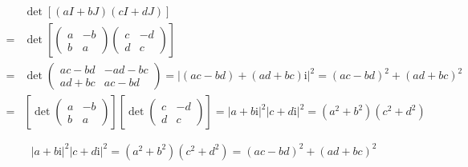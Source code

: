 \documentclass[
]{book}
\theoremstyle{definition}
\theoremstyle{definition}
\theoremstyle{definition}
\theoremstyle{definition}
\theoremstyle{remark}
\begin{document}
\[
\begin{aligned}
 & \det\left[\left(aI+bJ\right)\left(cI+dJ\right)\right]\\
= & \det\left[\begin{pmatrix}a & -b\\
b & a
\end{pmatrix}\begin{pmatrix}c & -d\\
d & c
\end{pmatrix}\right]\\
= & \det\begin{pmatrix}ac-bd & -ad-bc\\
ad+bc & ac-bd
\end{pmatrix}=\left|\left(ac-bd\right)+\left(ad+bc\right)\mathrm{i}\right|^{2}=\left(ac-bd\right)^{2}+\left(ad+bc\right)^{2}\\
= & \left[\det\begin{pmatrix}a & -b\\
b & a
\end{pmatrix}\right]\left[\det\begin{pmatrix}c & -d\\
d & c
\end{pmatrix}\right]=\left|a+b\mathrm{i}\right|^{2}\left|c+d\mathrm{i}\right|^{2}=\left(a^{2}+b^{2}\right)\left(c^{2}+d^{2}\right)
\end{aligned}
\]

\[
\left|a+b\mathrm{i}\right|^{2}\left|c+d\mathrm{i}\right|^{2}=\left(a^{2}+b^{2}\right)\left(c^{2}+d^{2}\right)=\left(ac-bd\right)^{2}+\left(ad+bc\right)^{2}
\]
\end{document}
